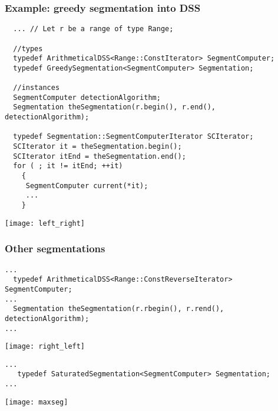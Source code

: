 \begin{frame}[containsverbatim]
  \frametitle{Example: greedy segmentation into DSS}

  \begin{lstlisting}
  ... // Let r be a range of type Range;

  //types
  typedef ArithmeticalDSS<Range::ConstIterator> SegmentComputer;
  typedef GreedySegmentation<SegmentComputer> Segmentation;

  //instances
  SegmentComputer detectionAlgorithm;
  Segmentation theSegmentation(r.begin(), r.end(), detectionAlgorithm);
                                 
  typedef Segmentation::SegmentComputerIterator SCIterator;  
  SCIterator it = theSegmentation.begin();
  SCIterator itEnd = theSegmentation.end();
  for ( ; it != itEnd; ++it) 
    {
     SegmentComputer current(*it);
     ...
    }
  \end{lstlisting}

 \begin{center}
   \texttt{[image: left\_right]}
 \end{center}

\end{frame}


\begin{frame}[containsverbatim]
  \frametitle{Other segmentations}

  \begin{lstlisting}
...
  typedef ArithmeticalDSS<Range::ConstReverseIterator> SegmentComputer;
...
  Segmentation theSegmentation(r.rbegin(), r.rend(), detectionAlgorithm);
...
  \end{lstlisting}

 \begin{center}
   \texttt{[image: right\_left]}
 \end{center}

  \begin{lstlisting}
...
   typedef SaturatedSegmentation<SegmentComputer> Segmentation;
...
  \end{lstlisting}

 \begin{center}
   \texttt{[image: maxseg]}
 \end{center}

\end{frame}

